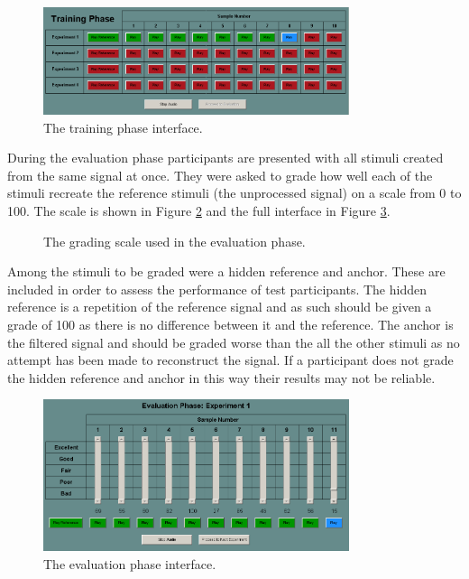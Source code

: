 			\begin{figure}[h!]
				\centering
				\includegraphics[width=0.8\textwidth]{chapter7/Images/MushraTraining.png}
				\caption{The training phase interface.}
				\label{fig:MushraTraining}
			\end{figure}

			During the evaluation phase participants are presented with all stimuli created from the same
			signal at once. They were asked to grade how well each of the stimuli recreate the reference
			stimuli (the unprocessed signal) on a scale from 0 to 100. The scale is shown in Figure
			\ref{fig:MushraScale} and the full interface in Figure \ref{fig:MushraEvaluation}.

			\begin{figure}[h!]
				\centering
				\caption{The grading scale used in the evaluation phase.}
				\label{fig:MushraScale}
			\end{figure}

			Among the stimuli to be graded were a hidden reference and anchor. These are included in order to
			assess the performance of test participants. The hidden reference is a repetition of the reference
			signal and as such should be given a grade of 100 as there is no difference between it and the
			reference. The anchor is the filtered signal and should be graded worse than the all the other
			stimuli as no attempt has been made to reconstruct the signal. If a participant does not grade the
			hidden reference and anchor in this way their results may not be reliable.

			\begin{figure}[h!]
				\centering
				\includegraphics[width=0.8\textwidth]{chapter7/Images/MushraEvaluation.png}
				\caption{The evaluation phase interface.}
				\label{fig:MushraEvaluation}
			\end{figure}

